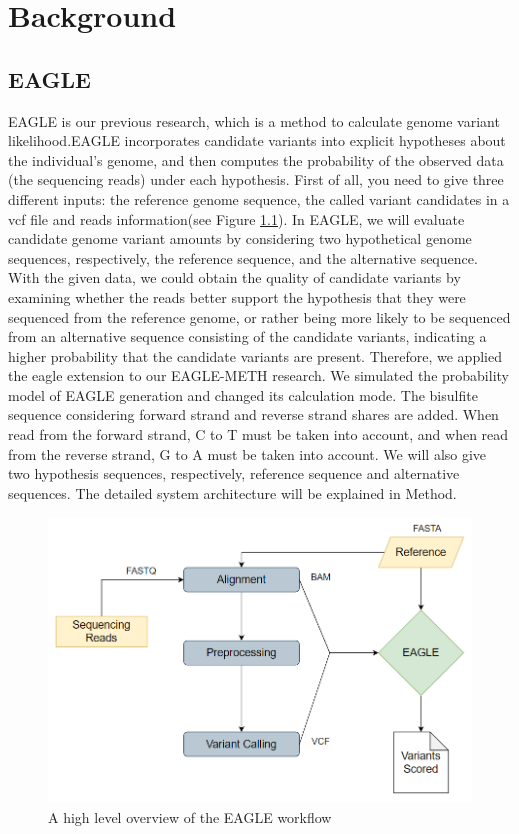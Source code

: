 \documentclass{PHlab-thesis}
\begin{document}
\chapter{Background}
\section{EAGLE}
EAGLE is our previous research, which is a method to calculate genome variant likelihood.EAGLE incorporates candidate variants into explicit hypotheses about the individual’s genome, and then computes the probability of the observed data (the sequencing reads) under each hypothesis. First of all, you need to give three different inputs: the reference genome sequence, the called variant candidates in a vcf file and reads information(see Figure \ref{fig:eagle_workflow}). In EAGLE, we will evaluate candidate genome variant amounts by considering two hypothetical genome sequences, respectively, the reference sequence, and the alternative sequence. With the given data, we could obtain the quality of candidate variants by examining whether the reads better support the hypothesis that they were sequenced from the reference genome, or rather being more likely to be sequenced from an alternative sequence consisting of the candidate variants, indicating a higher probability that the candidate variants are present.
Therefore, we applied the eagle extension to our EAGLE-METH research. We simulated the probability model of EAGLE generation and changed its calculation mode. The bisulfite sequence considering forward strand and reverse strand shares are added. When read from the forward strand, C to T must be taken into account, and when read from the reverse strand, G to A must be taken into account. We will also give two hypothesis sequences, respectively, reference sequence and alternative sequences. The detailed system architecture will be explained in Method.

\begin{figure}[h]
    \centering
    \includegraphics[scale=0.8]{figures/eagle_workflow.PNG}
    \caption{A high level overview of the EAGLE workflow}
    \label{fig:eagle_workflow}
\end{figure}
\end{document}
